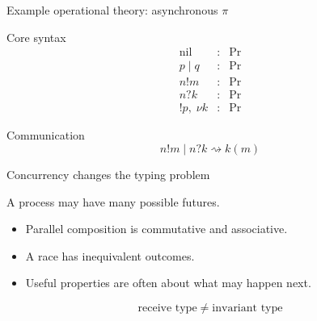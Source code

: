\documentclass[aspectratio=169,11pt]{beamer}
\newcommand{\Proc}{\mathrm{Pr}}
\newcommand{\rw}{\rightsquigarrow}
\begin{document}
\begin{frame}{Example operational theory: asynchronous \(\pi\)}
\begin{block}{Core syntax}
\[
\begin{array}{rcl}
  \mathrm{nil} &:& \Proc \\
  p\mid q &:& \Proc \\
  n!m &:& \Proc \\
  n?k &:& \Proc \\
  !p,\; \nu k &:& \Proc
\end{array}
\]
\end{block}

\begin{block}{Communication}
\[
  n!m\mid n?k \rw k(m)
\]
\end{block}
\end{frame}

\begin{frame}{Concurrency changes the typing problem}
\begin{center}
\Large A process may have many possible futures.
\end{center}

\vspace{0.6em}
\begin{itemize}
  \item Parallel composition is commutative and associative.
  \item A race has inequivalent outcomes.
  \item Useful properties are often about \alert{what may happen next}.
\end{itemize}

\vspace{0.6em}
\[
  \text{receive type} \;\neq\; \text{invariant type}
\]
\end{frame}
\end{document}
